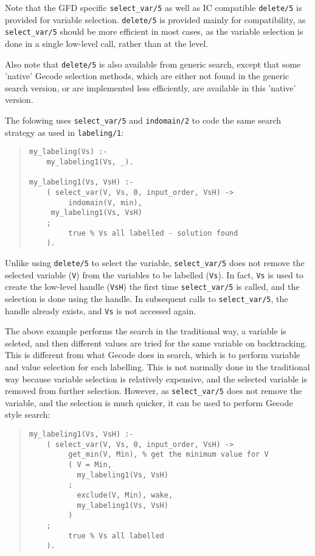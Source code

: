 Note that the GFD specific {\tt select_var/5} as well as IC compatible 
{\tt delete/5} is provided for variable selection. {\tt delete/5} is provided 
mainly for compatibility, as {\tt select_var/5} should be more efficient in
most cases, as the variable selection is done in a single low-level call,
rather than at the \eclipse level.

Also note that {\tt delete/5} 
is also available from generic search, except that
some 'native' Gecode selection methods, which are either not found in the 
generic search version,  or are implemented less efficiently, are available 
in this 'native' version. 

The folowing uses  \texttt{select_var/5} and \texttt{indomain/2} to code
the same search strategy as used in \texttt{labeling/1}:

\begin{quote}
\begin{verbatim}
my_labeling(Vs) :-
    my_labeling1(Vs, _).

my_labeling1(Vs, VsH) :-
    ( select_var(V, Vs, 0, input_order, VsH) ->
         indomain(V, min),
	 my_labeling1(Vs, VsH)
    ;
         true % Vs all labelled - solution found
    ).

\end{verbatim}
\end{quote}

Unlike using \texttt{delete/5} to select the variable, \texttt{select_var/5}
does not remove the selected variable (\texttt{V}) from the variables to be
labelled (\texttt{Vs}). In fact, \texttt{Vs} is used to create the low-level
handle (\texttt{VsH}) the first time \texttt{select_var/5} is called, and
the selection is done using the handle. In subsequent calls to
 \texttt{select_var/5}, the handle already exists, and \texttt{Vs} is not 
accessed again. 

The above example performs the search in the traditional way, a variable is
seleted, and then different values are tried for the same variable on 
backtracking. This is different from what Gecode does in search, which is to 
perform variable and value selection for each labelling. This is not normally
done in the traditional way because variable selection is relatively expensive,
and the selected variable is removed from further selection. However, as
\texttt{select_var/5} does not remove the variable, and the selection is
much quicker, it can be used to perform Gecode style search:

\begin{quote}
\begin{verbatim}
my_labeling1(Vs, VsH) :-
    ( select_var(V, Vs, 0, input_order, VsH) ->
         get_min(V, Min), % get the minimum value for V
         ( V = Min,
           my_labeling1(Vs, VsH)
         ;
           exclude(V, Min), wake,
           my_labeling1(Vs, VsH)
         )
    ;
         true % Vs all labelled
    ).
\end{verbatim}
\end{quote}

